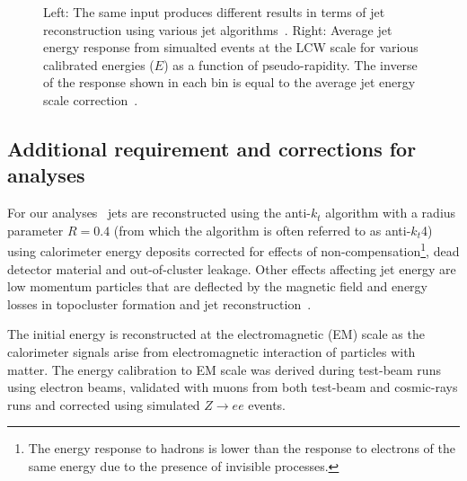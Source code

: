 \begin{figure}[tb]\begin{center}
        \caption{Left: The same input produces different results in terms of jet reconstruction using 
        various jet algorithms~\cite{Salam:2009jx}. Right: Average jet energy response from simualted events
        at the LCW scale for various calibrated energies ($E$) as a function of
        pseudo-rapidity. The inverse of the response shown 
        in each bin is equal to the average jet energy scale correction~\cite{jes}.}
\end{center}\end{figure}


\tocless\subsection{Additional requirement and corrections for analyses}

For our analyses~\cite{topcommon2013} jets are reconstructed using the anti-$k_t$
algorithm with a radius parameter $R=0.4$ (from which the algorithm is often referred to as anti-$k_t$4) 
using calorimeter energy deposits corrected for effects of non-compensation\footnote{The energy response 
to hadrons is lower than the response to electrons of the same energy due to the presence of invisible processes.},
dead detector material and out-of-cluster leakage.
Other effects affecting jet energy are low momentum particles
that are deflected by the magnetic field and energy losses in 
topocluster formation and jet reconstruction~\cite{jes}. 

The initial energy is reconstructed at the electromagnetic (EM) scale as
the calorimeter signals arise from electromagnetic interaction of
particles with matter. The energy calibration to EM scale was derived
during test-beam runs using electron beams, validated with muons
from both test-beam and cosmic-rays runs and corrected using simulated $Z\to ee$ events.

